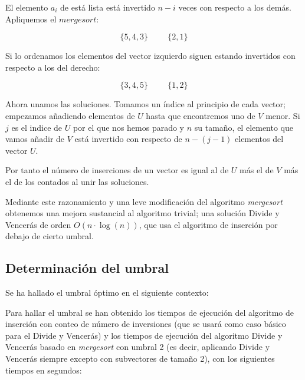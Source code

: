 El elemento $a_i$ de está lista está invertido $n-i$ veces con respecto a los demás. Apliquemos el $mergesort$:

$$ \{5,4,3\} \hspace{1cm} \{2,1\}$$

Si lo ordenamos los elementos del vector izquierdo siguen estando invertidos con respecto a los del derecho:

$$\{3,4,5\} \hspace{1cm} \{1,2\}$$

Ahora unamos las soluciones. Tomamos un índice al principio de cada vector; empezamos añadiendo elementos de $U$ hasta que encontremos uno de $V$ menor. Si $j$ es el indice de $U$ por el que nos hemos parado y $n$ su tamaño, el elemento que vamos añadir de $V$ está invertido con respecto de $n-(j-1)$ elementos del vector $U$.

Por tanto el número de inserciones de un vector es igual al de $U$ más el de $V$ más el de los contados al unir las soluciones.

Mediante este razonamiento y una leve modificación del algoritmo \textit{mergesort} obtenemos una mejora sustancial al algoritmo trivial; una solución Divide y Vencerás de orden $O(n\cdot \log(n))$, que usa el algoritmo de inserción por debajo de cierto umbral.

\subsection{Determinación del umbral}

Se ha hallado el umbral óptimo en el siguiente contexto:


Para hallar el umbral se han obtenido los tiempos de ejecución del algoritmo de inserción con conteo de número de inversiones (que se usará como caso básico para el Divide y Vencerás) y los tiempos de ejecución del algoritmo Divide y Vencerás basado en \textit{mergesort} con umbral 2 (es decir, aplicando Divide y Vencerás siempre excepto con subvectores de tamaño 2), con los siguientes tiempos en segundos:

\vspace*{1cm}

\prefIns
{}\prefDVt
{} {\prefIns}

